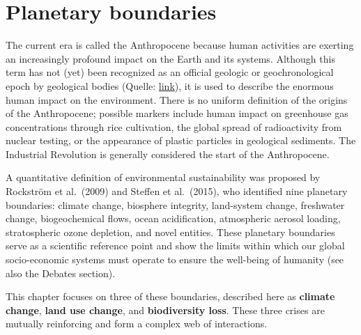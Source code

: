 \documentclass[
  a4paper,
  openany]{book}
\begin{document}
\section{Planetary boundaries}\label{planetary-boundaries}

The current era is called the Anthropocene because human activities are
exerting an increasingly profound impact on the Earth and its systems.
Although this term has not (yet) been recognized as an official geologic
or geochronological epoch by geological bodies (Quelle:
\href{https://www.nytimes.com/2024/03/05/climate/anthropocene-epoch-vote-rejected.html?unlocked_article_code=1.aU0.b2Ag.EdNlTI4oneVq&smid=url-share}{link}),
it is used to describe the enormous human impact on the environment.
There is no uniform definition of the origins of the Anthropocene;
possible markers include human impact on greenhouse gas concentrations
through rice cultivation, the global spread of radioactivity from
nuclear testing, or the appearance of plastic particles in geological
sediments. The Industrial Revolution is generally considered the start
of the Anthropocene.

A quantitative definition of environmental sustainability was proposed
by Rockström et al.~(2009) and Steffen et al.~(2015), who identified
nine planetary boundaries: climate change, biosphere integrity,
land-system change, freshwater change, biogeochemical flows, ocean
acidification, atmospheric aerosol loading, stratospheric ozone
depletion, and novel entities. These planetary boundaries serve as a
scientific reference point and show the limits within which our global
socio-economic systems must operate to ensure the well-being of humanity
(see also the Debates section).

This chapter focuses on three of these boundaries, described here as
\textbf{climate change}, \textbf{land use change}, and
\textbf{biodiversity loss}. These three crises are mutually reinforcing
and form a complex web of interactions.
\end{document}
